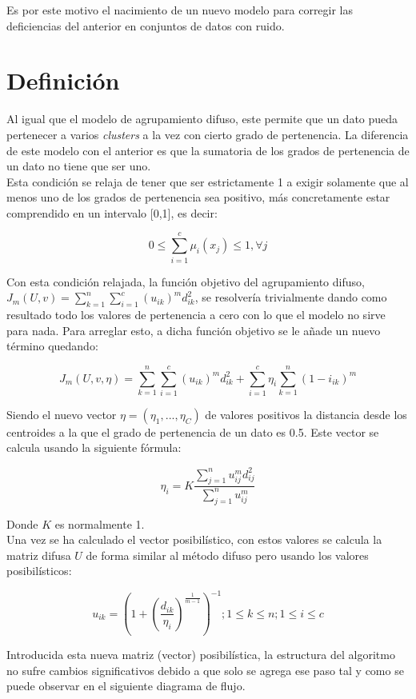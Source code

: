 \documentclass[]{report}
\begin{document}
		Es por este motivo el nacimiento de un nuevo modelo para corregir las deficiencias del anterior en conjuntos de datos con ruido.
	
		\section{Definición}
		
		Al igual que el modelo de agrupamiento difuso, este permite que un dato pueda pertenecer a varios \textit{clusters} a la vez con cierto grado de pertenencia. La diferencia de este modelo con el anterior es que la sumatoria de los grados de pertenencia de un dato no tiene que ser uno.\\
		
		Esta condición se relaja de tener que ser estrictamente 1 a exigir solamente que al menos uno de los grados de pertenencia sea positivo, más concretamente estar comprendido en un intervalo [0,1], es decir:
		
		$$ 0 \leq \sum_{i=1}^c\mu_i(x_j) \leq 1, \forall j $$
		
		Con esta condición relajada, la función objetivo del agrupamiento difuso, $J_m(U,v) = \sum_{k=1}^n \sum_{i=1}^c (u_{ik})^m d^2_{ik}$, se resolvería trivialmente dando como resultado todo los valores de pertenencia a cero con lo que el modelo no sirve para nada. Para arreglar esto, a dicha función objetivo se le añade un nuevo término quedando:
		
		$$J_m(U,v,\eta) = \sum_{k=1}^n \sum_{i=1}^c (u_{ik})^m d^2_{ik} + \sum_{i=1}^c \eta _i \sum_{k=1}^n (1-i_{ik})^m$$
		
		Siendo el nuevo vector $\eta = (\eta_1,...,\eta_C)$ de valores positivos la distancia desde los centroides a la que el grado de pertenencia de un dato es 0.5. Este vector se calcula usando la siguiente fórmula:
		
		$$\eta_i = K \frac{\sum_{j=1}^n u_{ij}^m d_{ij}^2}{\sum_{j=1}^n u_{ij}^m}$$
		
		Donde $K$ es normalmente 1.\\
		
		Una vez se ha calculado el vector posibilístico, con estos valores se calcula la matriz difusa $U$ de forma similar al método difuso pero usando los valores posibilísticos:
		
		$$u_{ik} = (1+(\frac{d _{ik}}{\eta_i})^{\frac{1}{m-1}})^{-1} ; 1 \leq k \leq n; 1\leq i \leq c $$
		
		Introducida esta nueva matriz (vector) posibilística, la estructura del algoritmo no sufre cambios significativos debido a que solo se agrega ese paso tal y como se puede observar en el siguiente diagrama de flujo.
		
\end{document}
